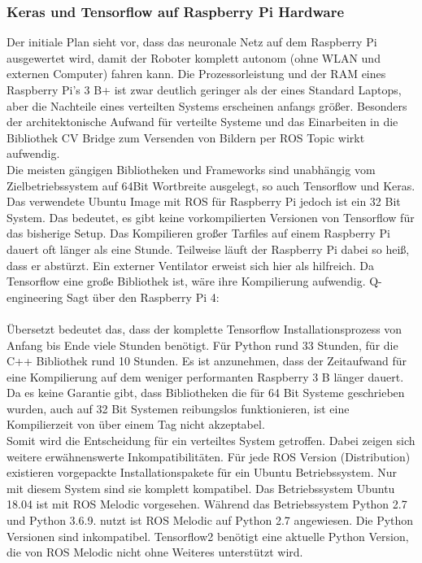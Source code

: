 \documentclass[conference]{IEEEtran}
\begin{document}
	\subsubsection{Keras und Tensorflow auf Raspberry Pi Hardware}
	Der initiale Plan sieht vor, dass das neuronale Netz auf dem Raspberry Pi 
	ausgewertet wird, damit der Roboter komplett autonom (ohne WLAN und 
	externen Computer) fahren kann. Die Prozessorleistung und der RAM 
	eines Raspberry Pi's 3 B+ ist zwar deutlich geringer als der eines 
	Standard Laptops, aber die Nachteile eines verteilten Systems erscheinen 
	anfangs größer. Besonders der architektonische Aufwand für verteilte 
	Systeme und das Einarbeiten in die Bibliothek CV Bridge zum Versenden 
	von Bildern per ROS Topic wirkt aufwendig. \\
	Die meisten gängigen Bibliotheken und Frameworks sind unabhängig vom 
	Zielbetriebssystem auf 64Bit Wortbreite ausgelegt, so auch Tensorflow 
	und Keras. Das verwendete Ubuntu Image mit ROS für Raspberry Pi 
	jedoch ist ein 32 Bit System. Das bedeutet, es gibt keine vorkompilierten 
	Versionen von Tensorflow für das bisherige Setup. Das Kompilieren 
	großer Tarfiles auf einem Raspberry Pi dauert oft länger als eine Stunde. 
	Teilweise läuft der Raspberry Pi dabei so heiß, dass er abstürzt. Ein 
	externer Ventilator erweist sich hier als hilfreich. Da Tensorflow eine große 
	Bibliothek ist, wäre ihre Kompilierung aufwendig.
Q-engineering	\cite{qengineering}
	Sagt über den Raspberry Pi 4: \\
	 \\
	Übersetzt bedeutet das, dass der komplette Tensorflow Installationsprozess von Anfang bis Ende viele Stunden benötigt. Für Python rund 33 Stunden, für die C++ 
	Bibliothek rund 10 Stunden.
	Es ist anzunehmen, dass der Zeitaufwand für eine Kompilierung auf dem 
	weniger performanten Raspberry 3 B länger dauert. Da es keine Garantie 
	gibt, dass Bibliotheken die für 64 Bit Systeme geschrieben wurden, auch 
	auf 32 Bit Systemen reibungslos funktionieren, ist eine Kompilierzeit 
	von über einem Tag nicht akzeptabel. \\
	
Somit wird die Entscheidung für ein verteiltes System getroffen. Dabei 
zeigen sich weitere erwähnenswerte Inkompatibilitäten. Für jede ROS 
Version (Distribution) existieren vorgepackte Installationspakete für ein 
Ubuntu Betriebssystem. Nur mit diesem System sind sie komplett 
kompatibel. Das Betriebssystem Ubuntu 18.04 ist mit ROS Melodic 
vorgesehen. Während das Betriebssystem Python 2.7 und Python 3.6.9. 
nutzt ist ROS Melodic auf Python 2.7 angewiesen. Die Python Versionen sind 
inkompatibel. Tensorflow2 benötigt eine aktuelle Python Version, die von 
ROS Melodic nicht ohne Weiteres unterstützt wird. \\
\end{document}
